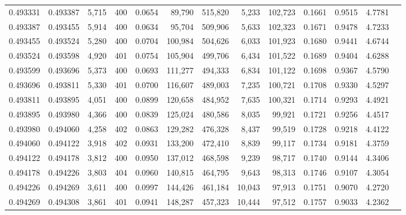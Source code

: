 \begin{tabular}{rrrrrrrrrrrrr}
0.493331 & 0.493387 & 5,715 & 400 &                                     0.0654 &  89,790 & 515,820 &   5,233 & 102,723 & 0.1661 & 0.9515 & 4.7781 \\
0.493387 & 0.493455 & 5,914 & 400 &                                     0.0634 &  95,704 & 509,906 &   5,633 & 102,323 & 0.1671 & 0.9478 & 4.7233 \\
0.493455 & 0.493524 & 5,280 & 400 &                                     0.0704 & 100,984 & 504,626 &   6,033 & 101,923 & 0.1680 & 0.9441 & 4.6744 \\
0.493524 & 0.493598 & 4,920 & 401 &                                     0.0754 & 105,904 & 499,706 &   6,434 & 101,522 & 0.1689 & 0.9404 & 4.6288 \\
0.493599 & 0.493696 & 5,373 & 400 &                                     0.0693 & 111,277 & 494,333 &   6,834 & 101,122 & 0.1698 & 0.9367 & 4.5790 \\
0.493696 & 0.493811 & 5,330 & 401 &                                     0.0700 & 116,607 & 489,003 &   7,235 & 100,721 & 0.1708 & 0.9330 & 4.5297 \\
0.493811 & 0.493895 & 4,051 & 400 &                                     0.0899 & 120,658 & 484,952 &   7,635 & 100,321 & 0.1714 & 0.9293 & 4.4921 \\
0.493895 & 0.493980 & 4,366 & 400 &                                     0.0839 & 125,024 & 480,586 &   8,035 &  99,921 & 0.1721 & 0.9256 & 4.4517 \\
0.493980 & 0.494060 & 4,258 & 402 &                                     0.0863 & 129,282 & 476,328 &   8,437 &  99,519 & 0.1728 & 0.9218 & 4.4122 \\
0.494060 & 0.494122 & 3,918 & 402 &                                     0.0931 & 133,200 & 472,410 &   8,839 &  99,117 & 0.1734 & 0.9181 & 4.3759 \\
0.494122 & 0.494178 & 3,812 & 400 &                                     0.0950 & 137,012 & 468,598 &   9,239 &  98,717 & 0.1740 & 0.9144 & 4.3406 \\
0.494178 & 0.494226 & 3,803 & 404 &                                     0.0960 & 140,815 & 464,795 &   9,643 &  98,313 & 0.1746 & 0.9107 & 4.3054 \\
0.494226 & 0.494269 & 3,611 & 400 &                                     0.0997 & 144,426 & 461,184 &  10,043 &  97,913 & 0.1751 & 0.9070 & 4.2720 \\
0.494269 & 0.494308 & 3,861 & 401 &                                     0.0941 & 148,287 & 457,323 &  10,444 &  97,512 & 0.1757 & 0.9033 & 4.2362 \\

\end{tabular}
